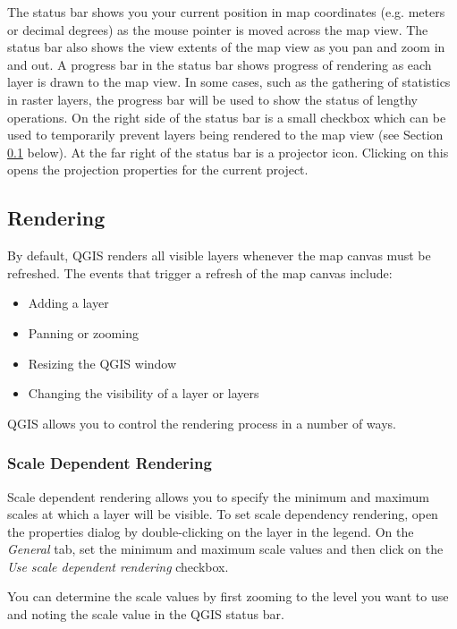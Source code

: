 The status bar shows you your current position in map coordinates (e.g.
meters or decimal degrees) as the mouse pointer is moved across the map view.
The  status bar also shows the view extents of the map view as you pan and
zoom in and out. A progress bar in the status bar shows progress of rendering
as each layer is drawn to the map view. In some cases, such as the gathering
of statistics in raster layers, the progress bar will be used to show the
status of lengthy operations. On the right side of the status bar is a small
checkbox which can be used to temporarily prevent layers being rendered to the
map view (see Section \ref{subsec:redraw_events} below). At the far right of
the status bar is a projector icon. Clicking on this opens the projection
properties for the current project.



\subsection{Rendering}\label{subsec:redraw_events}

By default, QGIS renders all visible layers whenever the map canvas must be
refreshed. The events that trigger a refresh of the map canvas include:

\begin{itemize}
\item Adding a layer
\item Panning or zooming
\item Resizing the QGIS window
\item Changing the visibility of a layer or layers
\end{itemize}

QGIS allows you to control the rendering process in a number of ways.

\subsubsection{Scale Dependent Rendering}
\label{label_scaledepend}

Scale dependent rendering allows you to specify the minimum and maximum
scales at which a layer will be visible.  To set scale dependency rendering,
open the properties dialog by double-clicking on the layer in the legend. On
the \textit{General} tab, set the minimum and maximum scale values and then
click on the \textit{Use scale dependent rendering} checkbox.

You can determine the scale values by first zooming to the level you want
to use and noting the scale value in the QGIS status bar.


